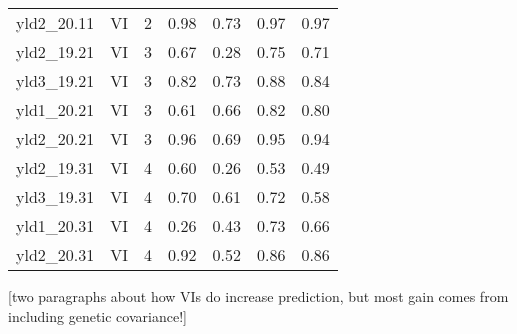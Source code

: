 \documentclass[12pt, letterpaper]{article}
\begin{document}
\begin{table}[ht]
\begin{tabular}{rlrrrrr}
  yld2\_20.11 & VI &   2 & 0.98 & 0.73 & 0.97 & 0.97 \\ 
  yld2\_19.21 & VI &   3 & 0.67 & 0.28 & 0.75 & 0.71 \\ 
  yld3\_19.21 & VI &   3 & 0.82 & 0.73 & 0.88 & 0.84 \\ 
  yld1\_20.21 & VI &   3 & 0.61 & 0.66 & 0.82 & 0.80 \\ 
  yld2\_20.21 & VI &   3 & 0.96 & 0.69 & 0.95 & 0.94 \\ 
  yld2\_19.31 & VI &   4 & 0.60 & 0.26 & 0.53 & 0.49 \\ 
  yld3\_19.31 & VI &   4 & 0.70 & 0.61 & 0.72 & 0.58 \\ 
  yld1\_20.31 & VI &   4 & 0.26 & 0.43 & 0.73 & 0.66 \\ 
  yld2\_20.31 & VI &   4 & 0.92 & 0.52 & 0.86 & 0.86 \\ 
   \hline
\end{tabular}
\end{table}


[two paragraphs about how VIs do increase prediction, but most gain comes from including genetic covariance!]










\end{document}
